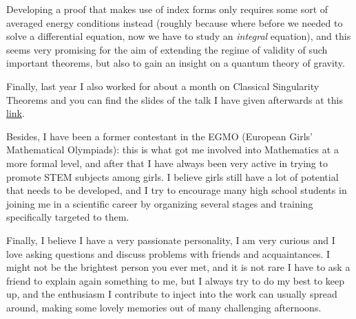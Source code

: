 \documentclass[12pt, a4paper]{article}
\begin{document}
Developing a proof that makes use of index forms only requires some sort of averaged energy conditions instead (roughly because where before we needed to solve a differential equation, now we have to study an \emph{integral} equation), and this seems very promising for the aim of extending the regime of validity of such important theorems, but also to gain an insight on a quantum theory of gravity.

Finally, last year I also worked for about a month on Classical Singularity Theorems and you can find the slides of the talk I have given afterwards at this \href{https://uz.sns.it/~ver22albireo/ext-file/colloquio/slides.pdf}{link}.

Besides, I have been a former contestant in the EGMO (European Girls' Mathematical Olympiads): this is what got me involved into Mathematics at a more formal level, and after that I have always been very active in trying to promote STEM subjects among girls. I believe girls still have a lot of potential that needs to be developed, and I try to encourage many high school students in joining me in a scientific career by organizing several stages and training specifically targeted to them.

Finally, I believe I have a very passionate personality, I am very curious and I love asking questions and discuss problems with friends and acquaintances. I might not be the brightest person you ever met, and it is not rare I have to ask a friend to explain again something to me, but I always try to do my best to keep up, and the enthusiasm I contribute to inject into the work can usually spread around, making some lovely memories out of many challenging afternoons.
\end{document}
